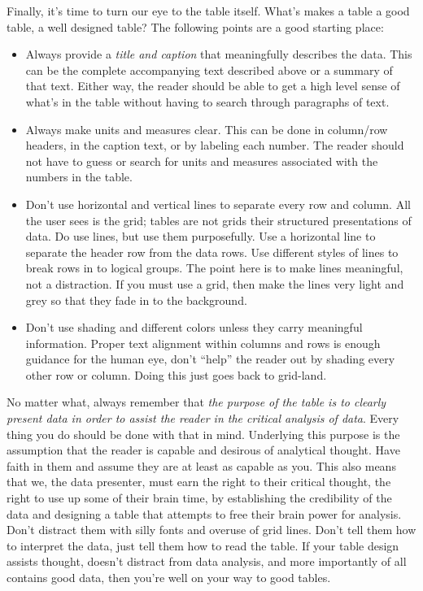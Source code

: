 \documentclass[]{tufte-handout}
\begin{document}
Finally, it's time to turn our eye to the table itself. What's makes a table a good table, a well designed table? The following points are a good starting place:
\begin{itemize}
\item Always provide a \textit{title and caption} that meaningfully describes the data. This can be the complete accompanying text described above or a summary of that text. Either way, the reader should be able to get a high level sense of what's in the table without having to search through paragraphs of text. 
\item Always make units and measures clear. This can be done in column/row headers, in the caption text, or by labeling each number. The reader should not have to guess or search for units and measures associated with the numbers in the table. 
\item Don't use horizontal and vertical lines to separate every row and column. All the user sees is the grid; tables are not grids their structured presentations of data. Do use lines, but use them purposefully. Use a horizontal line to separate the header row from the data rows. Use different styles of lines to break rows in to logical groups. The point here is to make lines meaningful, not a distraction. If you must use a grid, then make the lines very light and grey so that they fade in to the background.
\item Don't use shading and different colors unless they carry meaningful information. Proper text alignment within columns and rows is enough guidance for the human eye, don't ``help'' the reader out by shading every other row or column. Doing this just goes back to grid-land.
\end{itemize}

No matter what, always remember that \textit{the purpose of the table is to clearly present data in order to assist the reader in the critical analysis of data}. Every thing you do should be done with that in mind. Underlying this purpose is the assumption that the reader is capable and desirous of analytical thought. Have faith in them and assume they are at least as capable as you. This also means that we, the data presenter, must earn the right to their critical thought, the right to use up some of their brain time, by establishing the credibility of the data and designing a table that attempts to free their brain power for analysis. Don't distract them with silly fonts and overuse of grid lines. Don't tell them how to interpret the data, just tell them how to read the table.  If your table design assists thought, doesn't distract from data analysis, and more importantly of all contains good data, then you're well on your way to good tables.  
\end{document}
